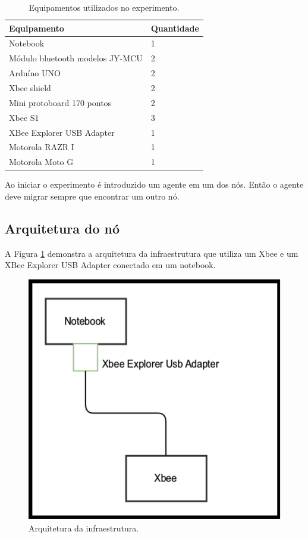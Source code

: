 \begin{table}[ht]
	\caption{Equipamentos utilizados no experimento.}
	\centering
	\begin{tabular}{|l|l|}
		\hline
		Equipamento & Quantidade \\ \hline
		Notebook & 1 \\ \hline 
		Módulo bluetooth modelos JY-MCU & 2 \\ \hline
		Arduíno UNO & 2 \\ \hline
		Xbee shield & 2 \\ \hline
		Mini protoboard 170 pontos & 2 \\ \hline
		Xbee S1 & 3 \\ \hline
		XBee Explorer USB Adapter & 1 \\ \hline 
		Motorola RAZR I & 1 \\ \hline
		Motorola Moto G & 1 \\ \hline
	\end{tabular}
	\label{tab:componentesPrototipo}
\end{table}

Ao iniciar o experimento é introduzido um agente em um dos nós. Então o agente deve migrar sempre que encontrar um outro nó.

\subsection{Arquitetura do nó}

A Figura \ref{fig:arquiteturaPrototipoInfraestrtura} demonstra a arquitetura da infraestrutura que utiliza um Xbee e um XBee Explorer USB Adapter conectado em um notebook.

\begin{figure}[htbp]
	\centering
	\includegraphics[scale=0.5]{metodologia/figuras/arquiteturaPrototipoInfraestrtura.pdf}
	\caption{Arquitetura da infraestrutura.}
	\label{fig:arquiteturaPrototipoInfraestrtura}
\end{figure}


